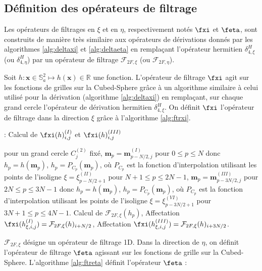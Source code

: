 \subsection{Définition des opérateurs de filtrage}

Les opérateurs de filtrages en $\xi$ et en $\eta$, respectivement notés $\fxi$ et $\feta$, sont construits de manière très similaire aux opérateurs de dérivations donnés par les algorithmes \ref{alg:deltaxi} et \ref{alg:deltaeta} en remplaçant l'opérateur hermitien $\delta^H_{4,\xi}$ (ou $\delta^H_{4,\eta}$) par un opérateur de filtrage $\mathcal{F}_{2F,\xi}$ (ou $\mathcal{F}_{2F,\eta}$).

Soit $h : \mathbf{x} \in \mathbb{S}_a^2 \mapsto h(\mathbf{x}) \in \mathbb{R}$ une fonction. L'opérateur de filtrage $\fxi$ agit sur les fonctions de grilles sur la Cubed-Sphere grâce à un algorithme similaire à celui utilisé pour la dérivation (algorithme  \ref{alg:deltaxi}) en remplaçant, sur chaque grand cercle l'opérateur de dérivation hermitien $\delta_{4,\xi}^H$. On définit $\fxi$ l'opérateur de filtrage dans la direction $\xi$ grâce à l'algorithme \ref{alg:ftrxi}.

\begin{center}
\begin{minipage}[H]{12cm}
  \begin{algorithm}[H]
    \caption{: Calcul de $\fxi(h)_{i,j}^{(I)}$ et $\fxi(h)_{i,j}^{(III)}$}\label{alg:ftrxi}
    \begin{algorithmic}[1]
    \State pour un grand cercle $C_j^{(2)}$ fixé,
             \State  $\mathbf{m}_p = \mathbf{m}_{p-N/2,j}^{(I)}$ pour $0  \leq p \leq N$ donc $h_p = h(\mathbf{m}_p)$,
             \State $h_p = P_{C_p}(\mathbf{m}_p)$, où $P_{C_p}$ est la fonction d'interpolation utilisant les points de l'isoligne $\xi = \xi^{(II)}_{p-N/2+1}$ pour $N+1 \leq p \leq 2N-1$,
             \State  $\mathbf{m}_p = \mathbf{m}_{p-3N/2,j}^{(III)}$ pour $2N  \leq p \leq 3N-1$ donc $h_p = h(\mathbf{m}_p)$,
             \State $h_p = P_{C_p}(\mathbf{m}_p)$, où $P_{C_p}$ est la fonction d'interpolation utilisant les points de l'isoligne $\xi = \xi^{(VI)}_{p-3N/2+1}$ pour $3N+1 \leq p \leq 4N-1$.
            \EndFor
    \State Calcul de $\mathcal{F}_{2F,\xi}(h_p)$,
    \State Affectation $\fxi(h_{\xi,i,j}^{(I)}) = \mathcal{F}_{2F,\xi}(h)_{i+N/2}$,
    \State Affectation $\fxi(h_{\xi,i,j}^{(III)}) = \mathcal{F}_{2F,\xi}(h)_{i+3N/2}$.
    \EndFor
    \end{algorithmic}
    \end{algorithm}
\end{minipage}
\end{center}
$\mathcal{F}_{2F,\xi}$ désigne un opérateur de filtrage 1D. Dans la direction de $\eta$, on définit l'opérateur de filtrage $\feta$ agissant sur les fonctions de grille sur la Cubed-Sphere. L'algorithme \ref{alg:ftreta} définit l'opérateur $\feta$ :

